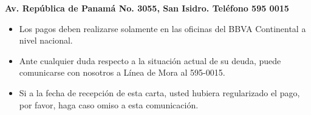 \vspace{1cm}
\begin{center}
\textbf{\small Av. República de Panamá No. 3055, San Isidro. Teléfono 595 0015  }
\end{center}

\vspace{1cm}
\begin{itemize}
  \item {\footnotesize Los pagos deben realizarse solamente en las oficinas del BBVA Continental a nivel nacional.}
  \item {\footnotesize Ante cualquier duda respecto a la situación actual de su deuda, puede comunicarse con nosotros a Línea de Mora al 595-0015.}
  \item {\footnotesize Si a la fecha de recepción de esta carta, usted hubiera regularizado el pago, por favor, haga caso omiso a esta comunicación.}
\end{itemize}







